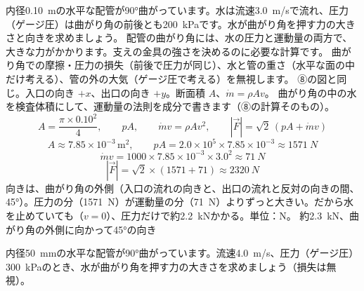 \begin{phreidai}[配管の曲がり角を支える力]
\label{ph:力-13:ex11}内径\qty{0.10}{m}の水平な配管が90°曲がっています。水は流速\qty{3.0}{m/s}で流れ、圧力（ゲージ圧）は曲がり角の前後とも\qty{200}{kPa}です。水が曲がり角を押す力の大きさと向きを求めましょう。
\phbamen
配管の曲がり角には、水の圧力と運動量の両方で、大きな力がかかります。支えの金具の強さを決めるのに必要な計算です。
\phmushi
曲がり角での摩擦・圧力の損失（前後で圧力が同じ）、水と管の重さ（水平な面の中だけ考える）、管の外の大気（ゲージ圧で考える）を無視します。
\phzu
⑧の図と同じ。入口の向き $+x$、出口の向き $+y$。断面積 $A$、$\dot m=\rho Av$。
\phriyu
曲がり角の中の水を検査体積にして、運動量の法則を成分で書きます（⑧の計算そのもの）。
\phtateru
\[ A=\frac{\pi\times0.10^2}{4},\qquad pA,\qquad \dot mv=\rho Av^2,\qquad |\vec{F}|=\sqrt2\,(pA+\dot mv) \]
\phtoku
\[ A\approx7.85\times10^{-3}\,\mathrm{m^2},\qquad pA=2.0\times10^5\times7.85\times10^{-3}\approx\qty{1571}{N} \]
\[ \dot mv=1000\times7.85\times10^{-3}\times3.0^2\approx\qty{71}{N} \]
\[ |\vec{F}|=\sqrt2\times(1571+71)\approx\qty{2320}{N} \]
\phtashikame
向きは、曲がり角の外側（入口の流れの向きと、出口の流れと反対の向きの間、45°）。圧力の分（\qty{1571}{N}）が運動量の分（\qty{71}{N}）よりずっと大きい。だから水を止めていても（$v=0$）、圧力だけで約\qty{2.2}{kN}かかる。単位：N。
\kotae 約\qty{2.3}{kN}、曲がり角の外側に向かって45°の向き
\end{phreidai}
\begin{jibun}
内径\qty{50}{mm}の水平な配管が90°曲がっています。流速\qty{4.0}{m/s}、圧力（ゲージ圧）\qty{300}{kPa}のとき、水が曲がり角を押す力の大きさを求めましょう（損失は無視）。
\end{jibun}

